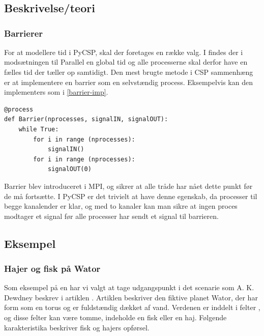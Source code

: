 \chapter{\des}
  \section{Beskrivelse/teori}
    
\subsection{Barrierer}\label{barrier}
For at modellere tid i PyCSP, skal der foretages en 
række valg. I \des findes der i modsætningen til 
Parallel \des {} en global tid og alle processerne skal derfor have  en 
fælles tid der tæller op samtidigt. Den mest brugte metode i CSP sammenhæng er 
at implementere en barrier som en selvstændig process. Eksempelvis kan den implementers som i \autoref{barrier-imp}.

\begin{lstlisting}[float, label=barrier-imp,caption=En barrier i PyCSP]
@process
def Barrier(nprocesses, signalIN, signalOUT):
	while True:
		for i in range (nprocesses):
			signalIN()
		for i in range (nprocesses):
			signalOUT(0)
\end{lstlisting}

Barrier blev introduceret i MPI, og sikrer at alle tråde har nået dette punkt 
før de må fortsætte. I PyCSP er det trivielt at have  denne egenskab, da 
processer til begge kanalender er klar, og med to kanaler kan man sikre at 
ingen proces modtager et signal før alle processer har sendt et signal til 
barrieren.

\section{Eksempel}


\subsection{Hajer og fisk på Wator} Som eksempel på en \des har vi valgt at tage 
udgangspunkt i det scenarie som A. K. Dewdney
beskrev i artiklen \cite{wator}. Artiklen beskriver den
fiktive planet Wator, der har form som en torus og er fuldstændig
dækket af vand. Verdenen er inddelt i felter \cite[s. 20]{wator}, og disse felter kan være tomme, indeholde en
fisk eller en haj. Følgende karakteristika beskriver fisk og hajers
opførsel.

